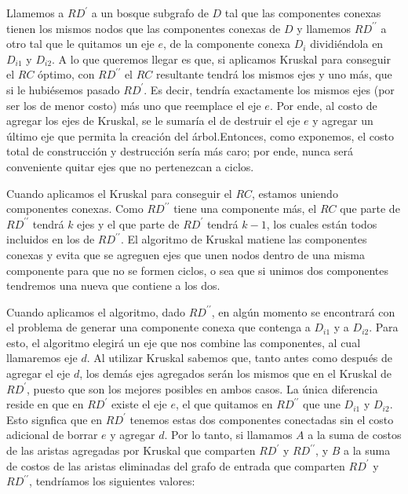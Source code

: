 Llamemos a $RD^{\prime}$ a un bosque subgrafo de $D$ tal que las componentes conexas tienen los mismos nodos que las componentes conexas de $D$ y llamemos $RD^{\prime\prime}$ a otro tal que le quitamos un eje $e$, de la componente conexa $D_i$ dividiéndola en $D_{i1}$ y $D_{i2}$. A lo que queremos llegar es que, si aplicamos Kruskal para conseguir el $RC$ óptimo, con $RD^{\prime\prime}$ el $RC$ resultante tendrá los mismos ejes y uno más, que si le hubiésemos pasado $RD^{\prime}$. Es decir, tendría exactamente los mismos ejes (por ser los de menor costo) más uno que reemplace el eje $e$. Por ende, al costo de agregar los ejes de Kruskal, se le sumaría el de destruir el eje $e$ y agregar un último eje que permita la creación del árbol.Entonces, como exponemos, el costo total de construcción y destrucción sería más caro; por ende, nunca será conveniente quitar ejes que no pertenezcan a ciclos. 

Cuando aplicamos el Kruskal para conseguir el $RC$, estamos uniendo componentes conexas. Como $RD^{\prime\prime}$ tiene una componente más, el $RC$ que parte de $RD^{\prime\prime}$ tendrá $k$ ejes y el que parte de $RD^{\prime}$ tendrá $k-1$, los cuales están todos incluidos en los de $RD^{\prime\prime}$. El algoritmo de Kruskal matiene las componentes conexas y evita que se agreguen ejes que unen nodos dentro de una misma componente para que no se formen ciclos, o sea que si unimos dos componentes tendremos una nueva que contiene a los dos.

Cuando aplicamos el algoritmo, dado $RD^{\prime\prime}$, en algún momento se encontrará con el problema de generar una componente conexa que contenga a $D_{i1}$  y a $D_{i2}$. Para esto, el algoritmo elegirá un eje que nos combine las componentes, al cual llamaremos eje $d$. Al utilizar Kruskal sabemos que, tanto antes como después de agregar el eje $d$, los demás ejes agregados serán los mismos que en el Kruskal de $RD^{\prime}$, puesto que son los mejores posibles en ambos casos. La única diferencia reside en que en $RD^{\prime}$ existe el eje $e$, el que quitamos en $RD^{\prime\prime}$ que une $D_{i1}$ y $D_{i2}$. Esto signfica que en $RD^{\prime}$ tenemos estas dos componentes conectadas sin el costo adicional de borrar $e$ y agregar $d$. Por lo tanto, si llamamos $A$ a la suma de costos de las aristas agregadas por Kruskal que comparten $RD^{\prime}$ y $RD^{\prime\prime}$, y $B$ a la suma de costos de las aristas eliminadas del grafo de entrada que comparten $RD^{\prime}$ y $RD^{\prime\prime}$, tendríamos los siguientes valores:

